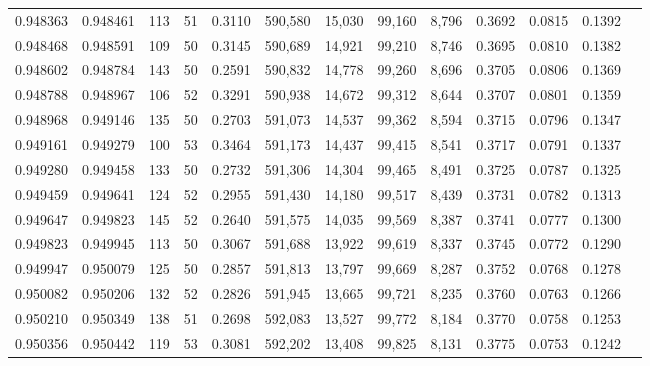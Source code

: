 \begin{tabular}{rrrrrrrrrrrrr}
0.948363 & 0.948461 &   113 &  51 &                                     0.3110 & 590,580 &  15,030 &  99,160 &   8,796 & 0.3692 & 0.0815 & 0.1392 \\
0.948468 & 0.948591 &   109 &  50 &                                     0.3145 & 590,689 &  14,921 &  99,210 &   8,746 & 0.3695 & 0.0810 & 0.1382 \\
0.948602 & 0.948784 &   143 &  50 &                                     0.2591 & 590,832 &  14,778 &  99,260 &   8,696 & 0.3705 & 0.0806 & 0.1369 \\
0.948788 & 0.948967 &   106 &  52 &                                     0.3291 & 590,938 &  14,672 &  99,312 &   8,644 & 0.3707 & 0.0801 & 0.1359 \\
0.948968 & 0.949146 &   135 &  50 &                                     0.2703 & 591,073 &  14,537 &  99,362 &   8,594 & 0.3715 & 0.0796 & 0.1347 \\
0.949161 & 0.949279 &   100 &  53 &                                     0.3464 & 591,173 &  14,437 &  99,415 &   8,541 & 0.3717 & 0.0791 & 0.1337 \\
0.949280 & 0.949458 &   133 &  50 &                                     0.2732 & 591,306 &  14,304 &  99,465 &   8,491 & 0.3725 & 0.0787 & 0.1325 \\
0.949459 & 0.949641 &   124 &  52 &                                     0.2955 & 591,430 &  14,180 &  99,517 &   8,439 & 0.3731 & 0.0782 & 0.1313 \\
0.949647 & 0.949823 &   145 &  52 &                                     0.2640 & 591,575 &  14,035 &  99,569 &   8,387 & 0.3741 & 0.0777 & 0.1300 \\
0.949823 & 0.949945 &   113 &  50 &                                     0.3067 & 591,688 &  13,922 &  99,619 &   8,337 & 0.3745 & 0.0772 & 0.1290 \\
0.949947 & 0.950079 &   125 &  50 &                                     0.2857 & 591,813 &  13,797 &  99,669 &   8,287 & 0.3752 & 0.0768 & 0.1278 \\
0.950082 & 0.950206 &   132 &  52 &                                     0.2826 & 591,945 &  13,665 &  99,721 &   8,235 & 0.3760 & 0.0763 & 0.1266 \\
0.950210 & 0.950349 &   138 &  51 &                                     0.2698 & 592,083 &  13,527 &  99,772 &   8,184 & 0.3770 & 0.0758 & 0.1253 \\
0.950356 & 0.950442 &   119 &  53 &                                     0.3081 & 592,202 &  13,408 &  99,825 &   8,131 & 0.3775 & 0.0753 & 0.1242 \\

\end{tabular}

